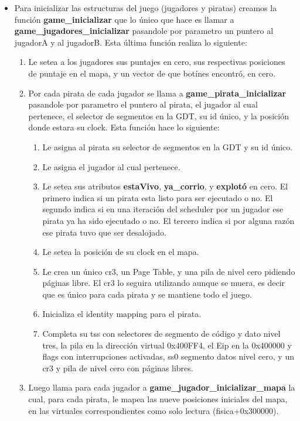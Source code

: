\documentclass[a4paper,10pt]{article}
\begin{document}
\begin{itemize}
  \item Para inicializar las estructuras del juego (jugadores y piratas) creamos la función \textbf{game\_inicializar} que lo único 
    que hace es llamar a \textbf{game\_jugadores\_inicializar} pasandole por parametro un puntero al jugadorA y al jugadorB.
    Esta última función realiza lo siguiente: 
    \begin{enumerate}
      \item Le setea a los jugadores sus puntajes en cero, sus respectivas posiciones de puntaje en el mapa, y 
      un vector de que botínes encontró, en cero.
      \item Por cada pirata de cada jugador se llama a \textbf{game\_pirata\_inicializar} pasandole por parametro el puntero al pirata,
        el jugador al cual pertenece, el selector de segmentos en la GDT, su id único, y la posición donde estara su clock.
      Esta función hace lo siguiente:
      \begin{enumerate}
        \item Le asigna al pirata su selector de segmentos en la GDT y su id único.
        \item Le asigna el jugador al cual pertenece.
        \item Le setea sus atributos \textbf{estaVivo}, \textbf{ya\_corrio}, y \textbf{explotó} en cero.
          El primero indica si un pirata esta listo para ser ejecutado o no.
          El segundo indica si en una iteración del scheduler por un jugador ese pirata ya ha sido ejecutado o no.
          El tercero indica si por alguna razón ese pirata tuvo que ser desalojado.
        \item Le setea la posición de su clock en el mapa.
        \item Le crea un único cr3, un Page Table, y una pila de nivel cero pidiendo páginas libre. El cr3 lo seguira utilizando aunque se muera, es decir que es único para 
          cada pirata y se mantiene todo el juego.
        \item Inicializa el identity mapping para el pirata.
        \item Completa su tss con selectores de segmento de código y dato nivel tres, la pila en la dirección virtual
          0x400FF4, el Eip en la 0x400000 y flags con interrupciones activadas, ss0 segmento datos nivel cero, y un cr3 y pila de nivel cero con páginas libres.
      \end{enumerate}
      \newpage
    \item Luego llama para cada jugador a \textbf{game\_jugador\_inicializar\_mapa} la cual, para cada pirata, 
      le mapea las nueve posiciones iniciales del mapa, en las virtuales correspondientes como solo lectura (fisica+0x300000).
    \end{enumerate}


\end{itemize}
\end{document}
